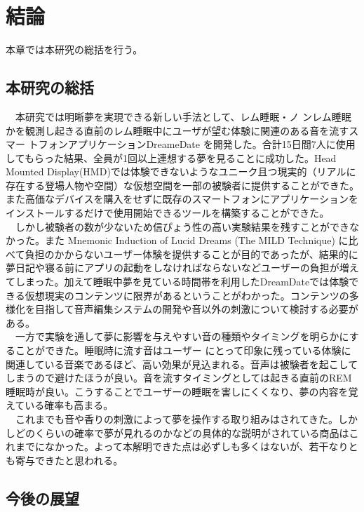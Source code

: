 \chapter{結論}
\label{chap:coding}

本章では本研究の総括を行う。
\section{本研究の総括}
　本研究では明晰夢を実現できる新しい手法として、レム睡眠・ノ ンレム睡眠かを観測し起きる直前のレム睡眠中にユーザが望む体験に関連のある音を流すスマー トフォンアプリケーションDreameDate を開発した。合計15日間7人に使用してもらった結果、全員が1回以上連想する夢を見ることに成功した。Head Mounted Display(HMD)では体験できないようなユニーク且つ現実的（リアルに存在する登場人物や空間）な仮想空間を一部の被験者に提供することができた。また高価なデバイスを購入をせずに既存のスマートフォンにアプリケーションをインストールするだけで使用開始できるツールを構築することができた。\\
　しかし被験者の数が少ないため信ぴょう性の高い実験結果を残すことができなかった。また Mnemonic Induction of Lucid Dreams (The MILD Technique)\cite{LaBerge} に比べて負担のかからないユーザー体験を提供することが目的であったが、結果的に夢日記や寝る前にアプリの起動をしなければならないなどユーザーの負担が増えてしまった。加えて睡眠中夢を見ている時間帯を利用したDreamDateでは体験できる仮想現実のコンテンツに限界があるということがわかった。コンテンツの多様化を目指して音声編集システムの開発や音以外の刺激について検討する必要がある。\\
　一方で実験を通して夢に影響を与えやすい音の種類やタイミングを明らかにすることができた。睡眠時に流す音はユーザー にとって印象に残っている体験に関連している音楽であるほど、高い効果が見込まれる。音声は被験者を起こしてしまうので避けたほうが良い。音を流すタイミングとしては起きる直前のREM睡眠時が良い。こうすることでユーザーの睡眠を害しにくくなり、夢の内容を覚えている確率も高まる。\\
　これまでも音や香りの刺激によって夢を操作する取り組みはされてきた。しかしどのくらいの確率で夢が見れるのかなどの具体的な説明がされている商品はこれまでになかった。よって本解明できた点は必ずしも多くはないが、若干なりとも寄与できたと思われる。

\section{今後の展望}

